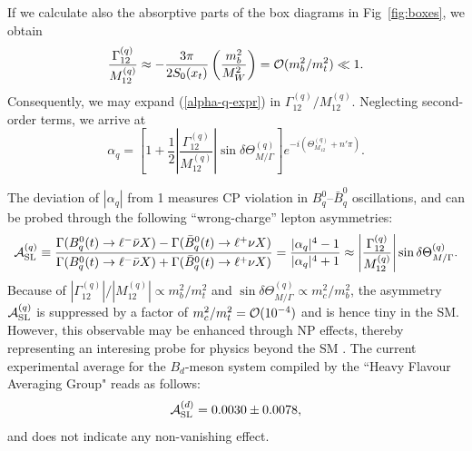 \documentclass[11pt]{cernrep}
\begin{document}
If we calculate also the absorptive parts of the box diagrams in
Fig~\ref{fig:boxes}, we obtain
\begin{equation}
\frac{\Gamma_{12}^{(q)}}{M_{12}^{(q)}}\approx
-\frac{3\pi}{2S_0(x_{t})}\left(\frac{m_b^2}{M_W^2}\right)
={\cal O}(m_b^2/m_t^2)\ll 1.
\end{equation}
Consequently, we may expand (\ref{alpha-q-expr}) in 
$\Gamma_{12}^{(q)}/M_{12}^{(q)}$. Neglecting second-order 
terms, we arrive at
\begin{equation}
\alpha_q=\left[1+\frac{1}{2}\left|
\frac{\Gamma_{12}^{(q)}}{M_{12}^{(q)}}\right|\sin\delta
\Theta_{M/\Gamma}^{(q)}\right]e^{-i\left(\Theta_{M_{12}}^{(q)}+n'\pi\right)}.
\end{equation}


The deviation of $|\alpha_q|$ from 1 measures CP violation in 
$B^0_q$--$\bar B^0_q$ oscillations, and can be probed through
the following ``wrong-charge'' lepton asymmetries:
\begin{equation}
{\cal A}^{(q)}_{\mbox{{\scriptsize SL}}}\equiv
\frac{\Gamma(B^0_q(t)\to \ell^-\bar\nu X)-\Gamma(\bar B^0_q(t)\to
\ell^+\nu X)}{\Gamma(B^0_q(t)\to \ell^-\bar \nu X)+
\Gamma(\bar B^0_q(t)\to \ell^+\nu X)}
=\frac{|\alpha_q|^4-1}{|\alpha_q|^4+1}\approx\left|
\frac{\Gamma_{12}^{(q)}}{M_{12}^{(q)}}\right|
\sin\delta\Theta^{(q)}_{M/\Gamma}.
\end{equation}
Because of $|\Gamma_{12}^{(q)}|/|M_{12}^{(q)}|\propto
m_b^2/m_t^2$ and $\sin\delta\Theta^{(q)}_{M/\Gamma}\propto m_c^2/m_b^2$,
the asymmetry ${\cal A}^{(q)}_{\mbox{{\scriptsize SL}}}$ is suppressed by 
a factor of $m_c^2/m_t^2={\cal O}(10^{-4})$ and is hence tiny in the SM.
However, this observable may be enhanced through NP effects, thereby
representing an interesing probe for physics beyond the SM 
\cite{LLNP,BBLN-CFLMT}.  The current experimental average for the $B_d$-meson
system compiled by the ``Heavy Flavour Averaging Group" \cite{HFAG} reads
as follows:
\begin{equation}%
{\cal A}^{(d)}_{\mbox{{\scriptsize SL}}}=0.0030\pm0.0078,
\end{equation}
and does not indicate any non-vanishing effect.


%
%
%
\end{document}
